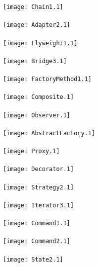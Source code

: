 \documentclass{article}
\begin{document}
\texttt{[image: Chain1.1]} \\ \vspace{2cm} \\
\texttt{[image: Adapter2.1]} \\ \vspace{2cm} \\
\texttt{[image: Flyweight1.1]} \\ \vspace{2cm} \\
\texttt{[image: Bridge3.1]} \\ \vspace{2cm} \\
\texttt{[image: FactoryMethod1.1]} \\ \vspace{2cm} \\
\texttt{[image: Composite.1]} \\ \vspace{2cm} \\
\texttt{[image: Observer.1]} \\ \vspace{2cm} \\
\texttt{[image: AbstractFactory.1]} \\ \vspace{2cm} \\
\texttt{[image: Proxy.1]} \\ \vspace{2cm} \\
\texttt{[image: Decorator.1]} \\ \vspace{2cm} \\
\texttt{[image: Strategy2.1]} \\ \vspace{2cm} \\
\texttt{[image: Iterator3.1]} \\ \vspace{2cm} \\
\texttt{[image: Command1.1]} \\ \vspace{2cm} \\
\texttt{[image: Command2.1]} \\ \vspace{2cm} \\
\texttt{[image: State2.1]} \\ \vspace{2cm} \\
\end{document}

